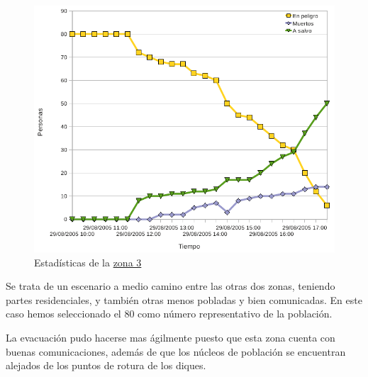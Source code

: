 \begin{figure}[H]
 \centering
 \includegraphics[width=135mm]{figuras/cap6/stats/Zona3.png}
 \caption{Estadísticas de la \hyperref[zona3]{zona 3}}
\end{figure}

Se trata de un escenario a medio camino entre las otras dos zonas, teniendo
partes residenciales, y también otras menos pobladas y bien comunicadas. En
este caso hemos seleccionado el 80 como número representativo de la población.

La evacuación pudo hacerse mas ágilmente puesto que esta zona cuenta con buenas
comunicaciones, además de que los núcleos de población se encuentran alejados de
los puntos de rotura de los diques.

